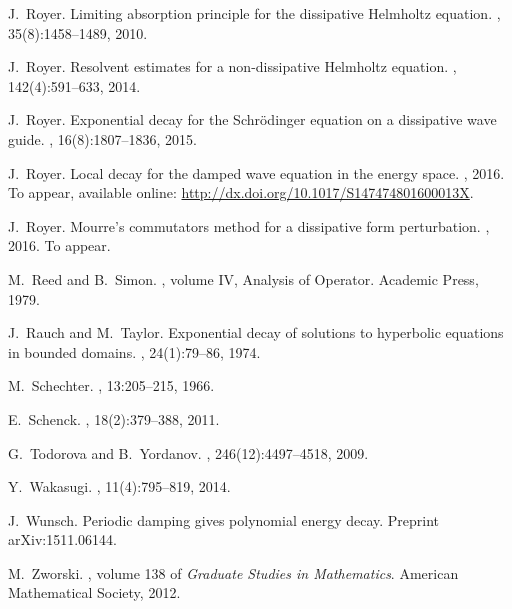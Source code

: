 \documentclass[10pt, a4paper,reqno]{amsart}
\theoremstyle{plain}
\theoremstyle{definition}
\theoremstyle{remark}
\begin{document}
\begin{thebibliography}{{Wak}14}
J.~Royer.
\newblock Limiting absorption principle for the dissipative {H}elmholtz
  equation.
, 35(8):1458--1489, 2010.

J.~Royer.
\newblock Resolvent estimates for a non-dissipative {H}elmholtz equation.
, 142(4):591--633, 2014.

J.~Royer.
\newblock Exponential decay for the {S}chr\"odinger equation on a dissipative
  wave guide.
, 16(8):1807--1836, 2015.

J.~Royer.
\newblock Local decay for the damped wave equation in the energy space.
, 2016.
\newblock To appear, available online:
  \url{http://dx.doi.org/10.1017/S147474801600013X}.

J.~Royer.
\newblock Mourre's commutators method for a dissipative form perturbation.
, 2016.
\newblock To appear.

M.~Reed and B.~Simon.
, volume IV, Analysis of
  Operator.
\newblock Academic Press, 1979.

J.~Rauch and M.~Taylor.
\newblock Exponential decay of solutions to hyperbolic equations in bounded
  domains.
, 24(1):79--86, 1974.

M.~{Schechter}.
, 13:205--215, 1966.

E.~{Schenck}.
, 18(2):379--388, 2011.

G.~{Todorova} and B.~{Yordanov}.
, 246(12):4497--4518, 2009.

Y.~{Wakasugi}.
, 11(4):795--819, 2014.

J.~Wunsch.
\newblock Periodic damping gives polynomial energy decay.
\newblock Preprint arXiv:1511.06144.

M.~Zworski.
, volume 138 of {\em Graduate Studies in
  Mathematics}.
\newblock American Mathematical Society, 2012.

\end{thebibliography}
\end{document}
